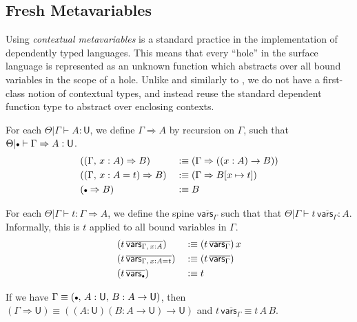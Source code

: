 \documentclass[acmsmall,review,anonymous,prologue,dvipsnames]{acmart}\settopmatter{printfolios=true,printccs=false,printacmref=false}
\renewcommand{\U}{\mathsf{U}}
\newcommand{\emptycon}{\scaleobj{.75}\bullet}
\newcommand{\To}{\Rightarrow}
\theoremstyle{remark}
\begin{document}
\subsection{Fresh Metavariables}

Using \emph{contextual metavariables} is a standard practice in the
implementation of dependently typed languages. This means that every ``hole'' in
the surface language is represented as an unknown function which abstracts over
all bound variables in the scope of a hole. Unlike \cite{nanevski2008contextual}
and similarly to \cite{gundry2013type}, we do not have a first-class notion of
contextual types, and instead reuse the standard dependent function type to
abstract over enclosing contexts.

\begin{definition} For each $\Theta|\Gamma \vdash A : \U$, we define
$\Gamma \To A$ by recursion on $\Gamma$, such that $\Theta|\emptycon\vdash
  \Gamma \To A : \U$.
  \begin{alignat*}{3}
    &((\Gamma,\, x : A) \To B)     && :\equiv (\Gamma \To ((x : A) \to B))\\
    &((\Gamma,\, x : A = t) \To B) && :\equiv (\Gamma \To B[x\mapsto t])\\
    &(\emptycon \To B)             && :\equiv B
  \end{alignat*}
\end{definition}

\begin{definition}[Contextualization] For each $\Theta|\Gamma \vdash t : \Gamma\To A$,
we define the spine $\overline{\mathsf{vars}_{\Gamma}}$ such that that
$\Theta|\Gamma\vdash t\,\overline{\mathsf{vars}_{\Gamma}} : A$. Informally, this
is $t$ applied to all bound variables in $\Gamma$.
  \begin{alignat*}{3}
    &(t\,\overline{\mathsf{vars}_{\Gamma,\,x:A}})   && :\equiv (t\,\overline{\mathsf{vars}_{\Gamma}})\,x \\
    &(t\,\overline{\mathsf{vars}_{\Gamma,\,x:A=t}}) && :\equiv (t\,\overline{\mathsf{vars}_{\Gamma}}) \\
    &(t\,\overline{\mathsf{vars}_{\emptycon}})     && :\equiv t
  \end{alignat*}
\end{definition}

\begin{example} If we have $\Gamma \equiv (\emptycon,\,A : \U,\,B : A \to \U)$, then
$(\Gamma \To \U) \equiv ((A : \U)(B : A \to \U) \to \U)$ and
$t\,\overline{\mathsf{vars}_{\Gamma}} \equiv t\,A\,B$.
\end{example}
\end{document}
